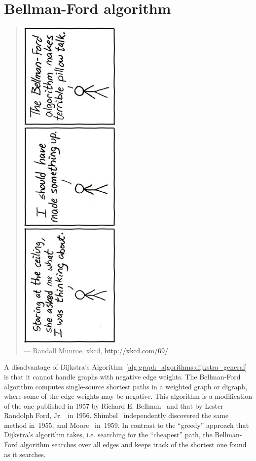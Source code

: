 \section{Bellman-Ford algorithm}

\begin{quote}
\includegraphics[scale=2.5]{image/pillow-talk-bellman-ford} \\
\noindent
--- Randall Munroe, xkcd,
\url{http://xkcd.com/69/}
\end{quote}

\noindent
A disadvantage of Dijkstra's
Algorithm~\ref{alg:graph_algorithms:dijkstra_general} is that it
cannot handle graphs with negative edge weights. The Bellman-Ford
algorithm computes single-source shortest paths in a weighted graph or
digraph, where some of the edge weights may be negative. This
algorithm is a modification of the one published in 1957 by Richard E.
Bellman~\cite{Bellman1957} and that by Lester Randolph Ford,
Jr.~\cite{Ford1956} in 1956. Shimbel~\cite{Shimbel1955} independently
discovered the same method in~1955, and Moore~\cite{Moore1959}
in~1959. In contrast to the ``greedy'' approach that Dijkstra's
algorithm takes, i.e. searching for the ``cheapest'' path, the
Bellman-Ford algorithm searches over all edges and keeps track of the
shortest one found as it searches.

